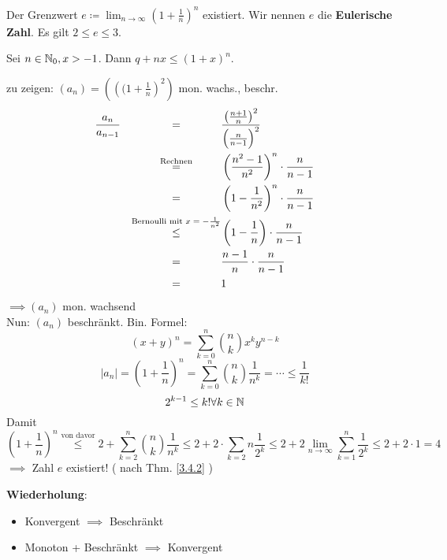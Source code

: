 \documentclass[consecutivenumbering]{gadsescript}
\begin{document}
\begin{subcorollary}
	Der Grenzwert $ e \coloneqq \lim_{n\to\infty} ( 1 + \frac{1}{n} )^n $ existiert.
	Wir nennen $ e $ die \textbf{Eulerische Zahl}. Es gilt $ 2\leq e \leq 3 $.
\end{subcorollary}
\begin{sublemma}
	Sei $n \in \mathbb{N}_0, x > -1$. Dann $ q + nx \leq ( 1 + x ) ^n $.
\end{sublemma}
\begin{subproof*}
	zu zeigen: $ (a_n) = \left( \left(( 1 + \frac{1}{n} \right)^2\right) $ mon. wachs., beschr.
	\begin{alignat*}{2}
		&\frac{a_n}{a_{n-1}} &\omit\hfill$=$\hfill& \frac{\left( \frac{n+1}{n}\right)^2}{\left(\frac{n}{n-1} \right)^2}\\
		&~&\omit\hfill$\overset{\text{Rechnen}}{=}$\hfill& \left( \frac{n^2-1}{n^2} \right)^n \cdot \frac{n}{n-1}\\
		&~&\omit\hfill$=$\hfill& \left( 1 - \frac{1}{n^2} \right)^n \cdot \frac{n}{n-1}\\
		&~&\omit\hfill$\overset{\text{Bernoulli mit $ x = -\frac{1}{n^2}$}}{\leq}$\hfill& \left( 1 - \frac{1}{n} \right) \cdot \frac{n}{n-1}\\
		&~&\omit\hfill$=$\hfill& \frac{n-1}{n} \cdot \frac{n}{n-1}\\
		&~&\omit\hfill$=$\hfill& 1
	\end{alignat*}
	$\implies ( a_n ) $ mon. wachsend\\
	Nun: $(a_n)$ beschränkt. Bin. Formel:
	\[( x + y )^n = \sum_{k=0}^{n} \binom{n}{k} x^ky^{n-k}\]
	\[ |a_n| = \left( 1 + \frac{1}{n} \right)^n = \sum_{k=0}^{n} \binom{n}{k}\frac{1}{n^k} = \dotsb \leq \frac{1}{k!}\]
	\[ 2^{k-1} \leq k! \forall k \in \mathbb{N} \]
	Damit
	\[ \left(1+\frac{1}{n} \right)^n \overset{\text{von davor}}{\leq} 2 + \sum_{k=2}^{n} \binom{n}{k}\frac{1}{n^k} \leq 2 + 2 \cdot \sum_{k=2}{n}\frac{1}{2^k} \leq 2 + 2\lim_{n\to\infty} \sum_{k=1}^{n}\frac{1}{2^k} \leq 2 + 2 \cdot 1 = 4 \]
	$\implies$ Zahl $e$ existiert! ( nach Thm. \ref{3.4.2} ) 
\end{subproof*}

\textbf{Wiederholung}:
\begin{itemize}
	\item Konvergent $\implies$ Beschränkt
	\item Monoton + Beschränkt $\implies$ Konvergent
\end{itemize}
\end{document}
